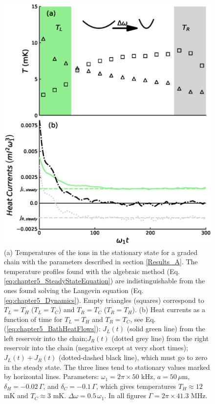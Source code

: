 \begin{figure}
  \center
  \includegraphics[width=0.75\linewidth]{Figures/24Mg_Temperature_Profiles_And_Evolution.eps}
  \caption{(a) Temperatures of the ions in the stationary state for a graded chain with the parameters described in section \ref{Results_A}. The temperature profiles found with the algebraic method (Eq. \eqref{eq:chapter5_SteadyStateEquation}) are indistinguishable from the ones found solving the Langevin equation (Eq. \eqref{eq:chapter5_Dynamics}). Empty triangles (squares) correspond to $T_L = T_H$ ($T_L = T_C$) and $T_R = T_C$ ($T_R = T_H$). (b) Heat currents  as a function of time for $T_L = T_H$ and $T_R = T_C$, see Eq. (\ref{eq:chapter5_BathHeatFlows}): $J_L(t)$ (solid green line) from the left reservoir into the chain;$J_R(t)$ (dotted grey line) from the right reservoir into the chain (negative except at very short times); $J_L(t)+J_R(t)$ (dotted-dashed black line), which must go to zero in the steady state. The three lines tend to stationary values marked by horizontal lines. Parameters: $\omega_1 = 2\pi \times 50$ kHz, $a=50\, \mu$m,  $\delta_H = -0.02 \, \Gamma$, and $\delta_C = -0.1 \, \Gamma$, which gives temperatures $T_H \approx 12$ mK and $T_C \approx 3$ mK. $\Delta\omega = 0.5 \, \omega_1$. In all figures $\Gamma = 2\pi \times 41.3$ MHz.}
  \label{fig:Temperature_Profiles_Magnesium}
\end{figure}

